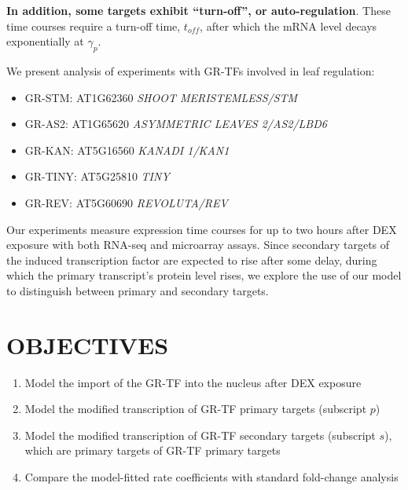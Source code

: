\documentclass[aspb,landscape]{a0poster}
\begin{document}
\begin{multicols}{3}
{    \textbf{In addition, some targets exhibit ``turn-off'', or auto-regulation}. These time courses require a turn-off time, $t_{off}$, after which the mRNA level decays exponentially at $\gamma_p$.
    
    We present analysis of experiments with GR-TFs involved in leaf regulation:
    \begin{itemize}
    \item GR-STM: AT1G62360 \textit{SHOOT MERISTEMLESS/STM}
    \item GR-AS2: AT1G65620 \textit{ASYMMETRIC LEAVES 2/AS2/LBD6}
    \item GR-KAN: AT5G16560 \textit{KANADI 1/KAN1}
    \item GR-TINY: AT5G25810 \textit{TINY}
    \item GR-REV: AT5G60690 \textit{REVOLUTA/REV}
    \end{itemize}
    
    Our experiments measure expression time courses for up to two hours after DEX exposure with both RNA-seq and microarray assays.
    Since secondary targets of the induced transcription factor are expected to rise after some delay, during which the primary transcript's protein level rises,
    we explore the use of our model to distinguish between primary and secondary targets.

  }


  \section*{OBJECTIVES}
  \color{CarnegiePriBlue}  

  {
    \begin{enumerate}
    \item Model the import of the GR-TF into the nucleus after DEX exposure
    \item Model the modified transcription of GR-TF primary targets (subscript $p$)
    \item Model the modified transcription of GR-TF secondary targets (subscript $s$), which are primary targets of GR-TF primary targets
    \item Compare the model-fitted rate coefficients with standard fold-change analysis
    \end{enumerate}
  }


\end{multicols}
\end{document}
